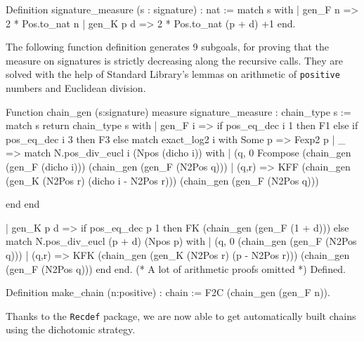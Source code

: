 \begin{Coqsrc}
Definition signature_measure (s : signature) : nat :=
match s with
  | gen_F n => 2 * Pos.to_nat n 
  | gen_K p d => 2 * Pos.to_nat (p + d) +1
end.
\end{Coqsrc}


The following function definition generates 9 subgoals,
for proving that the measure on signatures is strictly decreasing along
the recursive calls. They are solved with the help of Standard Library's lemmas 
on arithmetic of \texttt{positive} numbers and Euclidean division.




\begin{Coqsrc}
Function chain_gen  (s:signature) {measure signature_measure}
:  chain_type s :=
  match s  return chain_type s with
    | gen_F i =>
      if pos_eq_dec i 1 then F1 else
        if pos_eq_dec i 3
        then F3
        else 
          match exact_log2 i with
              Some p => Fexp2 p
            | _ =>
              match N.pos_div_eucl i (Npos (dicho i))
              with
                | (q, 0%
                  Fcompose  (chain_gen (gen_F (dicho i)))
                            (chain_gen (gen_F (N2Pos q)))
                | (q,r)  => KFF (chain_gen
                                   (gen_K (N2Pos r)
                                          (dicho i - N2Pos r)))
                                (chain_gen (gen_F (N2Pos q)))
                                
              end end
\end{Coqsrc}

\begin{Coqsrc}
    | gen_K p d =>
      if pos_eq_dec p 1 then FK (chain_gen (gen_F (1 + d)))
      else
        match N.pos_div_eucl (p + d)  (Npos p) with
          | (q, 0%
                              (chain_gen (gen_F (N2Pos q)))
          | (q,r)  => KFK (chain_gen (gen_K (N2Pos r)
                                            (p - N2Pos r)))
                          (chain_gen (gen_F (N2Pos q)))
        end
  end.
(* A lot of arithmetic proofs omitted *)
Defined.

Definition make_chain (n:positive) : chain :=
 F2C (chain_gen (gen_F n)).

\end{Coqsrc}

Thanks to the \texttt{Recdef} package, we are now able to get automatically 
built chains using the dichotomic strategy.



